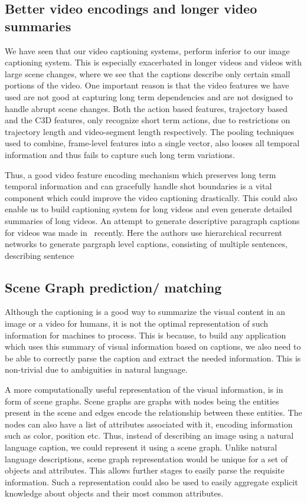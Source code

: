 \subsection{Better video encodings and longer video summaries}
We have seen that our video captioning systems, perform inferior to our image
captioning system.
This is especially exacerbated in longer videos and videos with large scene
changes, where we see that the captions describe only certain small portions of
the video.
One important reason is that the video features we have used are not good at
capturing long term dependencies and are not designed to handle abrupt scene
changes.
Both the action based features, trajectory based and the C3D features, only
recognize short term actions, due to restrictions on trajectory length and
video-segment length respectively.
The pooling techniques used to combine, frame-level features into a single
vector, also looses all temporal information and thus fails to capture such long
term variations.

Thus, a good video feature encoding mechanism which preserves long term temporal
information and can gracefully handle shot boundaries is a vital component which
could improve the video captioning drastically.
This could also enable us to build captioning system for long videos and even
generate detailed summaries of long videos.
An attempt to generate descriptive paragraph captions for videos was made 
in~\cite{yu2015video} recently.
Here the authors use hierarchical recurrent networks to generate pargraph level
captions, consisting of multiple sentences, describing 
sentence 

\subsection{Scene Graph prediction/ matching}
Although the captioning is a good way to summarize the visual content in an
image or a video for humans, it is not the optimal representation of such
information for machines to process.
This is because, to build any application which uses this summary of visual
information based on captions, we also need to be able to correctly parse the
caption and extract the needed information.
This is non-trivial due to ambiguities in natural language.

A more computationally useful representation of the visual information, is in
form of scene graphs.
Scene graphs are graphs with nodes being the entities present in the scene
and edges encode the relationship between these entities.
The nodes can also have a list of attributes associated with it, encoding
information such as color, position etc.
Thus, instead of describing an image using a natural language caption, we could
represent it using a scene graph.
Unlike natural language descriptions, scene graph representation would be unique
for a set of objects and attributes.
This allows further stages to easily parse the requisite information.
Such a representation could also be used to easily aggregate explicit knowledge
about objects and their most common attributes.

